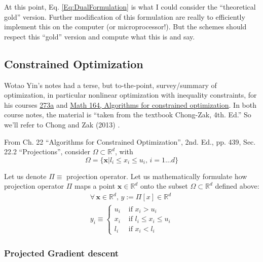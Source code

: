 \documentclass[10pt]{amsart}
\begin{document}
\begin{multicols*}{2}
At this point, Eq. \ref{Eq:DualFormulation} is what I could consider the ``theoretical gold'' version.  Further modification of this formulation are really to efficiently implement this on the computer (or microprocessor!).  But the schemes should respect this ``gold'' version and compute what this is and say.  

\subsection{Constrained Optimization}\label{Sec:ConstrainedOptimization}

Wotao Yin's notes had a terse, but to-the-point, survey/summary of optimization, in particular nonlinear optimization with inequality constraints, for his courses \href{http://www.math.ucla.edu/~wotaoyin/math273a/slides/Lec6_NLP_w_inequality_constraints_273a_2015_f.pdf}{273a} and \href{http://www.math.ucla.edu/~wotaoyin/math164/slides/wotao_yin_optimization_lec13_algorithms_for_constrained_optimization.pdf}{Math 164, Algorithms for constrained optimization}.  In both course notes, the material is ``taken from the textbook Chong-Zak, 4th. Ed.''  So we'll refer to Chong and Zak (2013) \cite{ChZa2013}.   

From Ch. 22 ``Algorithms for Constrained Optimization'', 2nd. Ed., pp. 439, Sec. 22.2 ``Projections'', consider $\Omega \subset \mathbb{R}^d$, with \[
\Omega = \lbrace \mathbf{x} | l_i \leq x_i \leq u_i , \, i = 1\dots d\rbrace
\]

Let us denote $\Pi \equiv $ projection operator.  Let us mathematically formulate how projection operator $\Pi$ maps a point $\mathbf{x} \in \mathbb{R}^d$ onto the subset $\Omega \subset \mathbb{R}^d$ defined above: 
\begin{equation}\label{Eq:ProjectionOperatorInequalities}
\begin{gathered}
  \forall \, \mathbf{x} \in \mathbb{R}^d, \, y := \Pi[x] \in \mathbb{R}^d \\ 
  y_i \equiv \begin{cases} u_i & \text{ if } x_i > u_i \\
    x_i & \text{ if } l_i \leq x_i \leq u_i \\
    l_i & \text{ if } x_i < l_i \end{cases}
  \end{gathered}
\end{equation}

\subsubsection{Projected Gradient descent}\label{SubSec:ProjectedGradDescent}


\end{multicols*}
\end{document}

